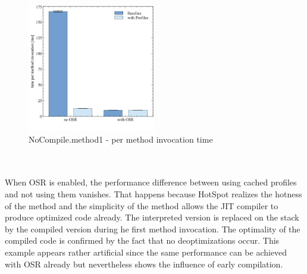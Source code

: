 \begin{figure}[ht]
  \begin{center}
    \centering
    \includegraphics[width=0.5\textwidth]{figures/nocompile.png}
    \caption{NoCompile.method1 - per method invocation time}
    \label{f:nocompile}
  \end{center}
\end{figure}
\\\\
When OSR is enabled, the performance difference between using cached profiles and not using them vanishes.
That happens because HotSpot realizes the hotness of the method and the simplicity of the method allows the JIT compiler to produce optimized code already. The interpreted version is replaced on the stack by the compiled version during he first method invocation. 
The optimality of the compiled code is confirmed by the fact that no deoptimizations occur.
This example appears rather artificial since the same performance can be achieved with OSR already but nevertheless shows the influence of early compilation.
